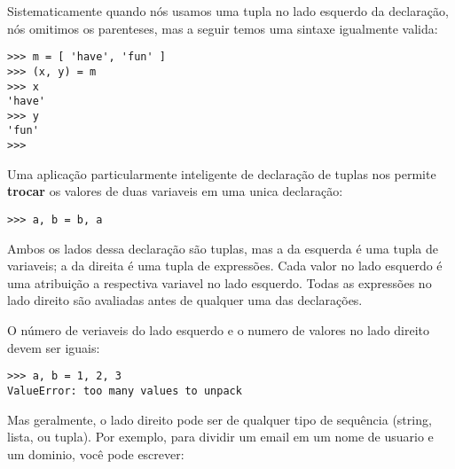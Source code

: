 Sistematicamente quando nós usamos uma tupla no lado esquerdo da
declaração, nós omitimos os parenteses, mas a seguir temos uma sintaxe
igualmente valida:

\beforeverb
\begin{verbatim}
>>> m = [ 'have', 'fun' ]
>>> (x, y) = m
>>> x
'have'
>>> y
'fun'
>>> 
\end{verbatim}
\afterverb
%
Uma aplicação particularmente inteligente de declaração de tuplas 
nos permite {\bf trocar} os valores de duas variaveis em uma unica declaração:

\beforeverb
\begin{verbatim}
>>> a, b = b, a
\end{verbatim}
\afterverb
%
Ambos os lados dessa declaração são tuplas, mas
a da esquerda é uma tupla de variaveis; a da direita é uma tupla de
expressões. Cada valor no lado esquerdo
é uma atribuição a respectiva variavel no lado esquerdo.
Todas as expressões no lado direito são avaliadas antes de qualquer
uma das declarações.

O número de veriaveis do lado esquerdo e o numero de valores
no lado direito devem ser iguais:


\beforeverb
\begin{verbatim}
>>> a, b = 1, 2, 3
ValueError: too many values to unpack
\end{verbatim}
\afterverb
%
Mas geralmente, o lado direito pode ser de qualquer tipo de sequência
(string, lista, ou tupla). Por exemplo, para dividir um email em
um nome de usuario e um dominio, você pode escrever:

